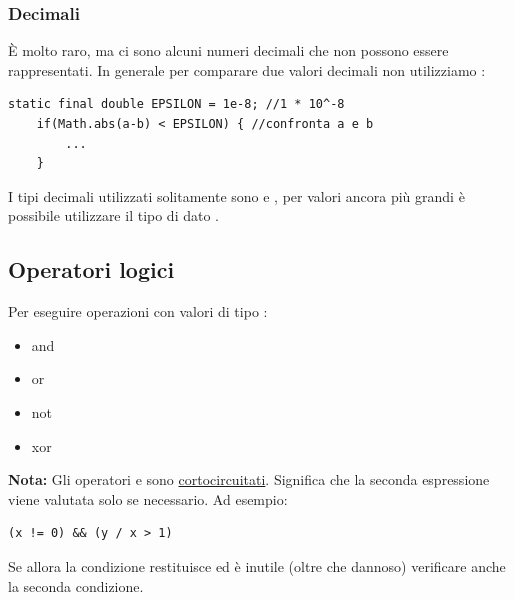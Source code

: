 \documentclass[../main.tex]{subfiles}
\begin{document}
\subsubsection{Decimali}
È molto raro, ma ci sono alcuni numeri decimali che non possono essere rappresentati. In generale per comparare due valori decimali
non utilizziamo \code{==}:
\begin{lstlisting}[style=java]
    static final double EPSILON = 1e-8; //1 * 10^-8
    if(Math.abs(a-b) < EPSILON) { //confronta a e b
        ...
    }
\end{lstlisting}
I tipi decimali utilizzati solitamente sono  e , per valori ancora più grandi è possibile utilizzare il tipo
di dato .

\subsection{Operatori logici}
Per eseguire operazioni con valori di tipo :
\begin{itemize}
    \item \code{\&\&} and
    \item \code{||} or
    \item \code{!} not
    \item \code{\^} xor
\end{itemize}

\textbf{Nota:} Gli operatori \code{\&\&} e \code{||} sono \underline{cortocircuitati}. Significa che la seconda espressione viene 
valutata solo se necessario. Ad esempio:
\begin{lstlisting}[style=java]
    (x != 0) && (y / x > 1)
\end{lstlisting}
Se  allora la condizione  restituisce  ed è inutile (oltre che dannoso) verificare anche la seconda
condizione.
\end{document}
